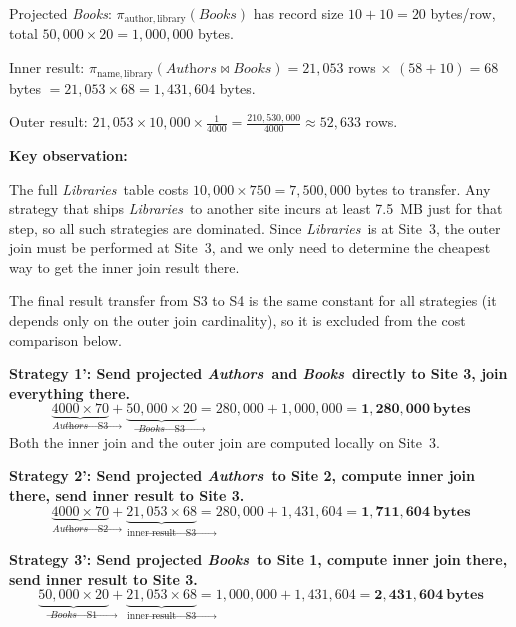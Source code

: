 \documentclass[a4paper,11pt]{article}
\newcommand{\join}{\mathbin{\bowtie}}
\newcommand{\Authors}{\textit{Authors}}
\newcommand{\Books}{\textit{Books}}
\newcommand{\Libraries}{\textit{Libraries}}
\begin{document}
Projected \Books: $\pi_{\text{author},\,\text{library}}(\Books)$ has record size $10 + 10 = 20$ bytes/row, total $50{,}000 \times 20 = 1{,}000{,}000$ bytes.

Inner result: $\pi_{\text{name},\,\text{library}}(\Authors \join \Books) = 21{,}053$ rows $\times$ $(58 + 10) = 68$ bytes $= 21{,}053 \times 68 = 1{,}431{,}604$ bytes.

Outer result: $21{,}053 \times 10{,}000 \times \tfrac{1}{4000} = \tfrac{210{,}530{,}000}{4000} \approx 52{,}633$ rows.

\medskip

\textbf{Key observation:}

The full \Libraries\ table costs $10{,}000 \times 750 = 7{,}500{,}000$ bytes to transfer. Any strategy that ships \Libraries\ to another site incurs at least 7.5~MB just for that step, so all such strategies are dominated. Since \Libraries\ is at Site~3, the outer join must be performed at Site~3, and we only need to determine the cheapest way to get the inner join result there.

The final result transfer from S3 to S4 is the same constant for all strategies (it depends only on the outer join cardinality), so it is excluded from the cost comparison below.

\medskip

\textbf{Strategy 1': Send projected \Authors\ and \Books\ directly to Site 3, join everything there.}
\[
  \underbrace{4000 \times 70}_{\Authors \to \text{S3}}
  + \underbrace{50{,}000 \times 20}_{\Books \to \text{S3}}
  = 280{,}000 + 1{,}000{,}000 = \mathbf{1{,}280{,}000\ \text{bytes}}
\]
Both the inner join and the outer join are computed locally on Site~3.

\medskip

\textbf{Strategy 2': Send projected \Authors\ to Site 2, compute inner join there, send inner result to Site 3.}
\[
  \underbrace{4000 \times 70}_{\Authors \to \text{S2}}
  + \underbrace{21{,}053 \times 68}_{\text{inner result} \to \text{S3}}
  = 280{,}000 + 1{,}431{,}604 = \mathbf{1{,}711{,}604\ \text{bytes}}
\]

\medskip

\textbf{Strategy 3': Send projected \Books\ to Site 1, compute inner join there, send inner result to Site 3.}
\[
  \underbrace{50{,}000 \times 20}_{\Books \to \text{S1}}
  + \underbrace{21{,}053 \times 68}_{\text{inner result} \to \text{S3}}
  = 1{,}000{,}000 + 1{,}431{,}604 = \mathbf{2{,}431{,}604\ \text{bytes}}
\]

\medskip
\end{document}
